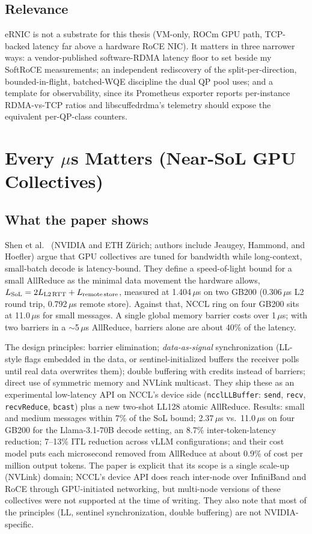 \documentclass[11pt,letterpaper]{article}
\begin{document}
\subsection{Relevance}

eRNIC is not a substrate for this thesis (VM-only, ROCm GPU path, TCP-backed latency far above a hardware RoCE NIC). It matters in three narrower ways: a vendor-published software-RDMA latency floor to set beside my SoftRoCE measurements; an independent rediscovery of the split-per-direction, bounded-in-flight, batched-WQE discipline the dual QP pool uses; and a template for observability, since its Prometheus exporter reports per-instance RDMA-vs-TCP ratios and libscuffedrdma's telemetry should expose the equivalent per-QP-class counters.

\section{Every $\mu$s Matters (Near-SoL GPU Collectives)}

\subsection{What the paper shows}

Shen et al.~\cite{sol2026} (NVIDIA and ETH Z\"urich; authors include Jeaugey, Hammond, and Hoefler) argue that GPU collectives are tuned for bandwidth while long-context, small-batch decode is latency-bound. They define a speed-of-light bound for a small AllReduce as the minimal data movement the hardware allows, $L_{\text{SoL}} = 2L_{\text{L2\,RTT}} + L_{\text{remote\,store}}$, measured at 1.404\,$\mu$s on two GB200 (0.306\,$\mu$s L2 round trip, 0.792\,$\mu$s remote store). Against that, NCCL ring on four GB200 sits at 11.0\,$\mu$s for small messages. A single global memory barrier costs over 1\,$\mu$s; with two barriers in a $\sim$5\,$\mu$s AllReduce, barriers alone are about 40\% of the latency.

The design principles: barrier elimination; \emph{data-as-signal} synchronization (LL-style flags embedded in the data, or sentinel-initialized buffers the receiver polls until real data overwrites them); double buffering with credits instead of barriers; direct use of symmetric memory and NVLink multicast. They ship these as an experimental low-latency API on NCCL's device side (\texttt{ncclLLBuffer}: \texttt{send}, \texttt{recv}, \texttt{recvReduce}, \texttt{bcast}) plus a new two-shot LL128 atomic AllReduce. Results: small and medium messages within 7\% of the SoL bound; 2.37\,$\mu$s vs.\ 11.0\,$\mu$s on four GB200 for the Llama-3.1-70B decode setting, an 8.7\% inter-token-latency reduction; 7--13\% ITL reduction across vLLM configurations; and their cost model puts each microsecond removed from AllReduce at about 0.9\% of cost per million output tokens. The paper is explicit that its scope is a single scale-up (NVLink) domain; NCCL's device API does reach inter-node over InfiniBand and RoCE through GPU-initiated networking, but multi-node versions of these collectives were not supported at the time of writing. They also note that most of the principles (LL, sentinel synchronization, double buffering) are not NVIDIA-specific.
\end{document}
